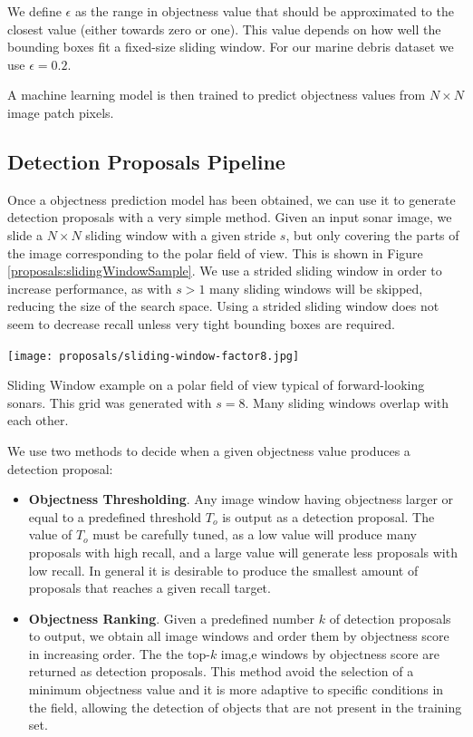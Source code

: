We define $\epsilon$ as the range in objectness value that should be approximated to the closest value (either towards zero or one). This value depends on how well the bounding boxes fit a fixed-size sliding window. For our marine debris dataset we use $\epsilon = 0.2$.

A machine learning model is then trained to predict objectness values from $N \times N$ image patch pixels.

\subsection{Detection Proposals Pipeline}

Once a objectness prediction model has been obtained, we can use it to generate detection proposals with a very simple method. Given an input sonar image, we slide a $N \times N$ sliding window with a given stride $s$, but only covering the parts of the image corresponding to the polar field of view. This is shown in Figure \ref{proposals:slidingWindowSample}. We use a strided sliding window in order to increase performance, as with $s > 1$ many sliding windows will be skipped, reducing the size of the search space. Using a strided sliding window does not seem to decrease recall unless very tight bounding boxes are required.

\begin{marginfigure}[-2cm]
	\centering
	\texttt{[image: proposals/sliding-window-factor8.jpg]}
	\vspace*{0.5cm}
	\caption{Sliding Window example on a polar field of view typical of forward-looking sonars. This grid was generated with $s = 8$. Many sliding windows overlap with each other.}
	\label{proposals:slidingWindowSample}
\end{marginfigure}

We use two methods to decide when a given objectness value produces a detection proposal:

\begin{itemize}
	\item \textbf{Objectness Thresholding}. Any image window having objectness larger or equal to a predefined threshold $T_o$ is output as a detection proposal. The value of $T_o$ must be carefully tuned, as a low value will produce many proposals with high recall, and a large value will generate less proposals with low recall. In general it is desirable to produce the smallest amount of proposals that reaches a given recall target.
	\item \textbf{Objectness Ranking}. Given a predefined number $k$ of detection proposals to output, we obtain all image windows and order them by objectness score in increasing order. The the top-$k$ imag,e windows by objectness score are returned as detection proposals. This method avoid the selection of a minimum objectness value and it is more adaptive to specific conditions in the field, allowing the detection of objects that are not present in the training set.
\end{itemize}

